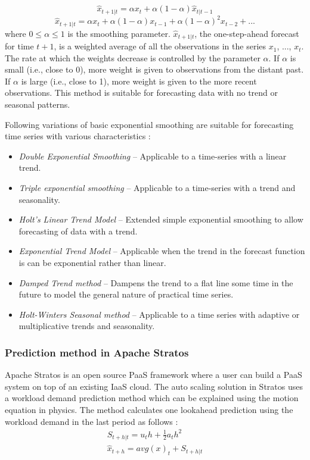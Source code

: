 	$$\hat{x}_{t+1|t}=\alpha x_t +\alpha(1-\alpha)\hat{x}_{t|t-1}$$
	$$\hat{x}_{t+1|t}=\alpha x_t +\alpha(1-\alpha)x_{t-1}+\alpha(1-\alpha)^2x_{t-2}+...$$
where $0\leq \alpha \leq 1$ is the smoothing parameter. $\hat{x}_{t+1|t}$, the one-step-ahead forecast for time $t+1$, is a weighted average of all the observations in the series $x_1$, ..., $x_t$. The rate at which the weights decrease is controlled by the parameter $\alpha$. If $\alpha$ is small (i.e., close to 0), more weight is given to observations from the distant past. If $\alpha$ is large (i.e., close to 1), more weight is given to the more recent observations. This method is suitable for forecasting data with no trend or seasonal patterns.

Following variations of basic exponential smoothing are suitable for forecasting time series with various characteristics \cite{Forecasting_OTexts}:

\begin{itemize}
\item \textit{Double Exponential Smoothing} -- Applicable to a time-series with a linear trend.
\item \textit{Triple exponential smoothing} -- Applicable to a time-series with a trend and seasonality.
\item \textit{Holt's Linear Trend Model} -- Extended simple exponential smoothing to allow forecasting of data with a trend.
\item \textit{Exponential Trend Model} -- Applicable when the trend in the forecast function is can be exponential rather than linear.
\item \textit{Damped Trend method} -- Dampens the trend to a flat line some time in the future to model the general nature of practical time series.
\item \textit{Holt-Winters Seasonal method} -- Applicable to a time series with adaptive or multiplicative trends and seasonality.
\end{itemize}

\subsubsection{Prediction method in Apache Stratos}
Apache Stratos is an open source PaaS framework where a user can build a PaaS system on top of an existing IaaS cloud. The auto scaling solution in Stratos uses a workload demand prediction method which can be explained using the motion equation in physics. The method calculates one lookahead prediction using the workload demand in the last period as follows \cite{StratosModel}:
\begin{eqnarray}
S_{t+h|t} = u_{t}h+ \frac{1}{2} a_{t}h^2 \\
\hat{x}_{t+h}=avg(x)_{t} + S_{t+h|t} 
\end{eqnarray}

